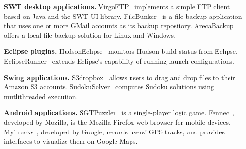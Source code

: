 \begin{myindentpar}{-2mm}
\begin{itemize}%
\Item \textbf{SWT desktop applications.}
VirgoFTP~\cite{virgo} implements a simple FTP client based on Java and the SWT UI library.
FileBunker~\cite{filebunker} is a file backup application that uses one or more GMail
accounts as its backup repository. ArecaBackup~\cite{areca} offers a local
file backup solution for Linux and Windows.

\vspace{0.5mm}
\vspace{0.5mm}

\Item \textbf{Eclipse plugins.}
HudsonEclipse~\cite{hudson} monitors Hudson build status from Eclipse.
EclipseRunner~\cite{eclipserunner} extends Eclipse's capability of running launch configurations.

\vspace{0.5mm}

\Item \textbf{Swing applications.} %
S3dropbox~\cite{s3dropbox}  allows users
to drag and drop files to their Amazon S3 accounts. SudokuSolver~\cite{sudokusolver}
computes Sudoku solutions using mutlithreaded execution. 

\vspace{0.5mm}

\Item  \textbf{Android applications.} %
SGTPuzzler~\cite{sgtpuzzles} is a single-player logic game.
Fennec~\cite{fennec}, developed by Mozilla, is the Mozilla
Firefox web browser for mobile devices. 
MyTracks~\cite{mytracks}, developed by Google, records users' GPS tracks, and provides
interfaces to visualize them on Google Maps. 

\end{itemize}
\end{myindentpar}


